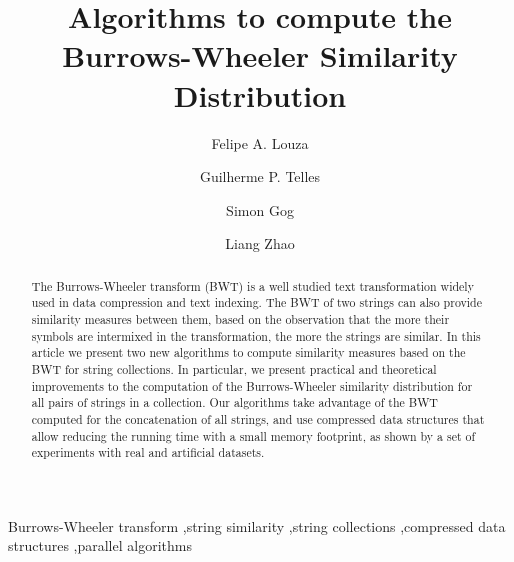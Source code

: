 \documentclass{elsarticle}
\begin{document}
\begin{frontmatter}

\title{Algorithms to compute the Burrows-Wheeler Similarity Distribution}



\author[usp]{Felipe A. Louza}
\author[unicamp]{Guilherme P. Telles}
\author[ebay]{Simon Gog}
\author[usp]{Liang Zhao}

\address[usp]{Department of Computing and Mathematics, University of S\~ao Paulo, \\Ribeir\~ao Preto, Brazil}
\address[unicamp]{Instituto de Computa\c{c}\~ao, Universidade Estadual de Campinas, Campinas, Brazil}
\address[ebay]{eBay Inc., San Jose, USA}

\begin{abstract}
The Burrows-Wheeler transform (BWT) is a well studied text transformation widely used in data compression and text indexing. The BWT of two strings can also provide similarity measures between them, based on the observation that the more their symbols are intermixed in the transformation, the more the strings are similar. In this article we present two new algorithms to compute similarity measures based on the BWT for string collections. In particular, we present practical and theoretical improvements to the computation of the Burrows-Wheeler similarity distribution for all pairs of strings in a collection. Our algorithms take advantage of the BWT computed for the concatenation of all strings, and use compressed data structures that allow reducing the running time with a small memory footprint, as shown by a set of experiments with real and artificial datasets.
\end{abstract}

\begin{keyword}
Burrows-Wheeler transform \sep string similarity \sep string collections
\sep compressed data structures \sep parallel algorithms
\end{keyword}

\end{frontmatter}
\end{document}
